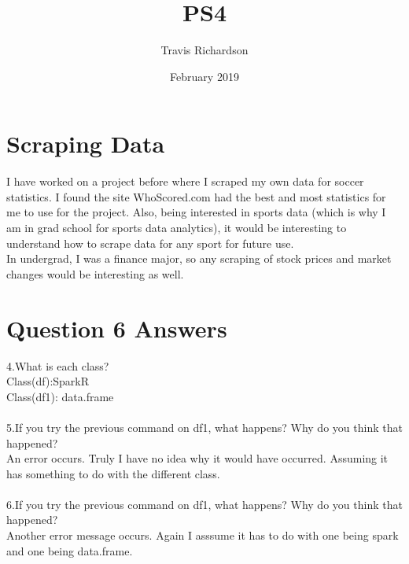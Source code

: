 \documentclass{article}
\title{PS4}
\author{Travis Richardson }
\date{February 2019}
\begin{document}
\maketitle

\section{Scraping Data}
I have worked on a project before where I scraped my own data for soccer statistics. I found the site WhoScored.com had the best and most statistics for me to use for the project. Also, being interested in sports data (which is why I am in grad school for sports data analytics), it would be interesting to understand how to scrape data for any sport for future use. 
\\In undergrad, I was a finance major, so any scraping of stock prices and market changes would be interesting as well. 



\section{Question 6 Answers}
4.What is each class?
\\
Class(df):SparkR
\\
Class(df1): data.frame
\\
\\
5.If you try the previous command on df1, what happens? Why do you think
that happened?
\\
An error occurs. Truly I have no idea why it would have occurred. Assuming it has something to do with the different class.
\\
\\
6.If you try the previous command on df1, what happens? Why do you think
that happened?
\\
Another error message occurs. Again I asssume it has to do with one being spark and one being data.frame.
\end{document}
